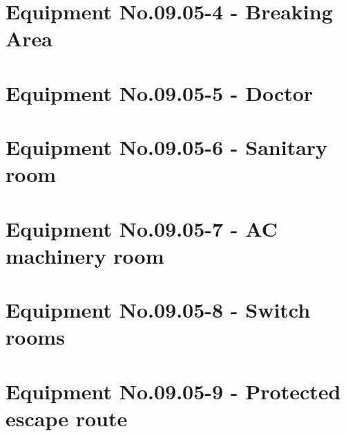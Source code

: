 

\clearpage
\section{Equipment No.09.05-4	- Breaking Area}

\clearpage
\section{Equipment No.09.05-5	- Doctor}

\clearpage
\section{Equipment No.09.05-6	- Sanitary room}

\clearpage
\section{Equipment No.09.05-7	- AC machinery room}

\clearpage
\section{Equipment No.09.05-8	- Switch rooms}

\clearpage
\section{Equipment No.09.05-9	- Protected escape route}

\twoColls{

}{

}
